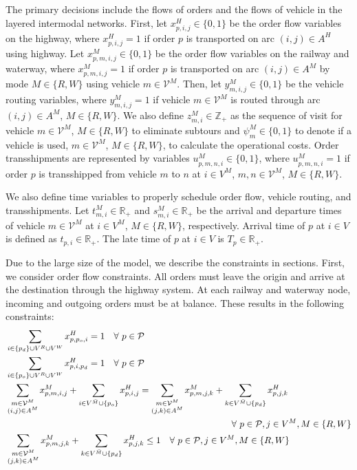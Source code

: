 \documentclass[12pt]{article}
\numberwithin{equation}{section}
\begin{document}
	The primary decisions include the flows of orders and the flows of vehicle in the layered intermodal networks. First, let $x^H_{p, i, j}\in\{0, 1\}$ be the order flow variables on the highway, where $x^H_{p, i, j}=1$ if order $p$ is transported on arc $(i,j)\in A^H$ using highway. Let $x^M_{p, m, i, j}\in\{0, 1\}$ be the order flow variables on the railway and waterway, where $x^M_{p, m, i, j}=1$ if order $p$ is transported on arc $(i, j)\in A^M$ by mode $M\in\{R, W\}$ using vehicle $m\in\mathcal{V}^M$. Then, let $y^M_{m, i, j}\in\{0, 1\}$ be the vehicle routing variables, where $y^M_{m, i, j}=1$ if vehicle $m\in\mathcal{V}^M$ is routed through arc $(i, j)\in A^M$, $M\in\{R, W\}$. We also define $z^M_{m, i}\in\mathbb{Z}_+$ as the sequence of visit for vehicle $m\in\mathcal{V}^M$,  $M\in\{R, W\}$ to eliminate subtours and $\psi^M_{m}\in\{0, 1\}$ to denote if a vehicle is used, $m\in\mathcal{V}^M$,  $M\in\{R, W\}$, to calculate the operational costs. Order transshipments are represented by variables $u^M_{p, m, n, i}\in\{0, 1\}$, where $u^M_{p, m, n, i}=1$ if order $p$ is transshipped from vehicle $m$ to $n$ at $i\in V^M$, $m, n\in\mathcal{V}^M$, $M\in\{R, W\}$.
	
	We also define time variables to properly schedule order flow, vehicle routing, and transshipments. Let $t^M_{m, i}\in\mathbb{R}_+$ and $s^M_{m, i}\in\mathbb{R}_+$ be the arrival and departure times of vehicle $m\in \mathcal{V}^M$ at $i\in V^M$, $M\in\{R, W\}$, respectively. Arrival time of $p$ at $i\in V$ is defined as $t_{p, i}\in\mathbb{R}_+$. The late time of $p$ at $i\in V$ is $T_{p}\in\mathbb{R}_+$.
	
	Due to the large size of the model, we describe the constraints in sections. First, we consider order flow constraints. All orders must leave the origin and arrive at the destination through the highway system. At each railway and waterway node, incoming and outgoing orders must be at balance. These results in the following constraints:
	\begin{align}
	&\sum_{i\in \{p_d\}\cup V^R\cup V^W}x^H_{p, p_o, i}=1\quad\forall\ p\in \mathcal{P}\label{eq:origin_1}\\
	&\sum_{i\in \{p_o\}\cup V^R\cup V^W}x^H_{p, i, p_d}=1\quad\forall\ p\in \mathcal{P}\label{eq:destination_1}\\
	&\sum_{\substack{m\in\mathcal{V}^M\\(i, j)\in A^M}}x^M_{p, m, i, j}+\sum_{i\in V^{\bar{M}}\cup\{p_o\}}x^H_{p, i, j}=\sum_{\substack{m\in\mathcal{V}^M\\(j, k)\in A^M}}x^M_{p, m, j, k}+\sum_{k\in V^{\bar{M}}\cup\{p_d\}}x^H_{p, j, k}\notag\\
	&\text{\hspace{250pt}}\forall\ p\in \mathcal{P}, j\in V^M, M\in \{R, W\}\label{eq:order_balance}\\
	&\sum_{\substack{m\in\mathcal{V}^M\\(j, k)\in A^M}}x^M_{p, m, j, k}+\sum_{k\in V^{\bar{M}}\cup\{p_d\}}x^H_{p, j, k}\le1\quad\forall\ p\in \mathcal{P}, j\in V^M, M\in \{R, W\}\label{eq:outgoing_1}
	\end{align}
	
\end{document}
